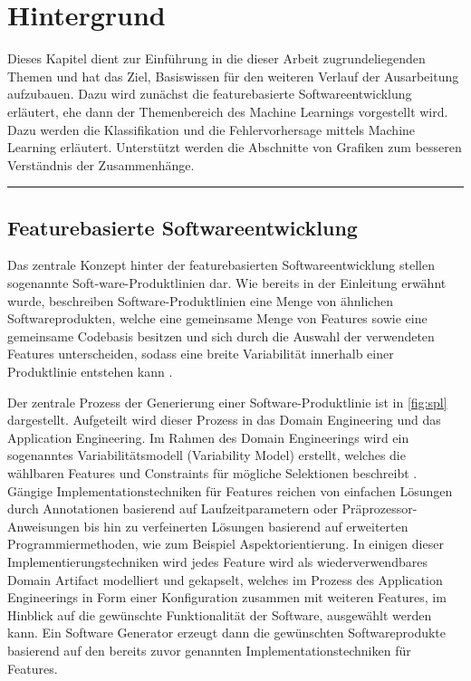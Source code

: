 
\chapter{Hintergrund}
\label{background}

Dieses Kapitel dient zur Einführung in die dieser Arbeit zugrundeliegenden Themen und hat das Ziel, Basiswissen für den weiteren Verlauf der Ausarbeitung aufzubauen. Dazu wird zunächst die featurebasierte Softwareentwicklung erläutert, ehe dann der Themenbereich des Machine Learnings vorgestellt wird. Dazu werden die Klassifikation und die Fehlervorhersage mittels Machine Learning erläutert. Unterstützt werden die Abschnitte von Grafiken zum besseren Verständnis der Zusammenhänge.
\\
\hrule

\section{Featurebasierte Softwareentwicklung}
\label{feat-develop}

Das zentrale Konzept hinter der featurebasierten Softwareentwicklung stellen sogenannte Soft-ware-Produktlinien dar. Wie bereits in der Einleitung erwähnt wurde, beschreiben Software-Produktlinien eine Menge von ähnlichen Softwareprodukten, welche eine gemeinsame Menge von Features sowie eine gemeinsame Codebasis besitzen und sich durch die Auswahl der verwendeten Features unterscheiden, sodass eine breite Variabilität innerhalb einer Produktlinie entstehen kann \cite{Apel2013,Thuem2014}.

Der zentrale Prozess der Generierung einer Software-Produktlinie ist in \autoref{fig:spl} dargestellt. Aufgeteilt wird dieser Prozess in das Domain Engineering und das Application Engineering. Im Rahmen des Domain Engineerings wird ein sogenanntes Variabilitätsmodell (Variability Model) erstellt, welches die wählbaren Features und Constraints für mögliche Selektionen beschreibt \cite{Apel2013}. Gängige Implementationstechniken für Features reichen von einfachen Lösungen durch Annotationen basierend auf Laufzeitparametern oder Präprozessor-Anweisungen bis hin zu verfeinerten Lösungen basierend auf erweiterten Programmiermethoden, wie zum Beispiel Aspektorientierung. In einigen dieser Implementierungstechniken wird jedes Feature wird als wiederverwendbares Domain Artifact modelliert und gekapselt, welches im Prozess des Application Engineerings in Form einer Konfiguration zusammen mit weiteren Features, im Hinblick auf die gewünschte Funktionalität der Software, ausgewählt werden kann. Ein Software Generator erzeugt dann die gewünschten Softwareprodukte basierend auf den bereits zuvor genannten Implementationstechniken für Features.

